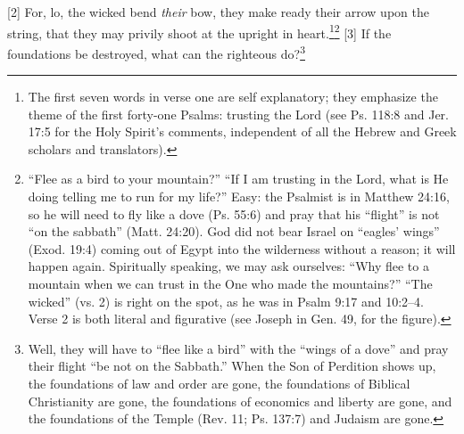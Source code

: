 [2] \textcolor[rgb]{0.00,0.00,1.00}{For, lo, the wicked bend \emph{their} bow, they make ready their arrow upon the string, that they may privily shoot at the upright in heart.}\footnote{The first seven words in verse one are self explanatory; they emphasize the theme of the first forty-one Psalms: trusting the Lord (see Ps. 118:8 and Jer. 17:5 for the Holy Spirit’s comments, independent of all the Hebrew and Greek scholars and translators).}\footnote{“Flee as a bird to your mountain?” “If I am trusting in the Lord, what is He doing telling me to run for my life?” Easy: the Psalmist is in Matthew 24:16, so he will need to fly like a dove (Ps. 55:6) and pray that his “flight” is not “on the sabbath” (Matt. 24:20). God did not bear Israel on “eagles’ wings” (Exod. 19:4) coming out of Egypt into the wilderness without a reason; it will happen again. Spiritually speaking, we may ask ourselves: “Why flee to a mountain when we can trust in the One who made the mountains?” “The wicked” (vs. 2) is right on the spot, as he was in Psalm 9:17 and 10:2–4. Verse 2 is both literal and figurative (see Joseph in Gen. 49, for the figure).}
[3] \textcolor[rgb]{0.00,0.00,1.00}{If the foundations be destroyed, what can the righteous do?}\footnote{Well, they will have to “flee like a bird” with the “wings of a dove” and pray their flight “be not on the Sabbath.” When the Son of Perdition shows up, the foundations of law and order are gone, the foundations of Biblical Christianity are gone, the foundations of economics and liberty are gone, and the foundations of the Temple (Rev. 11; Ps. 137:7) and Judaism are gone.}
